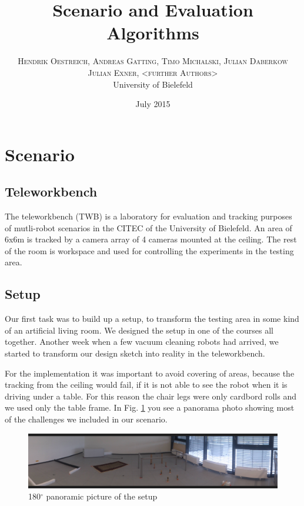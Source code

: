 \documentclass[twoside]{article}
\title{\vspace{-15mm}\fontsize{24pt}{10pt}\selectfont\textbf{Scenario and Evaluation Algorithms}} %
\author{
\large
\textsc{Hendrik Oestreich, Andreas Gatting, Timo Michalski, Julian Daberkow}\\
\textsc{Julian Exner, <further Authors>}\\%
\normalsize University of Bielefeld \\ %
}
\date{July 2015}
\begin{document}
\maketitle %

\thispagestyle{fancy} %




\section{Scenario}
\subsection{Teleworkbench}
The teleworkbench (TWB) is a laboratory for evaluation and tracking purposes of mutli-robot scenarios in the CITEC of the University of Bielefeld. An area of 6x6m is tracked by a camera array of 4 cameras mounted at the ceiling. The rest of the room is workspace and used for controlling the experiments in the testing area. 

\subsection{Setup} %
Our first task was to build up a setup, to transform the testing area in some kind of an artificial living room. We designed the setup in one of the courses all together. Another week when a few vacuum cleaning robots had arrived, we started to transform our design sketch into reality in the teleworkbench.

For the implementation it was important to avoid covering of areas, because the tracking from the ceiling would fail, if it is not able to see the robot when it is driving under a table.
For this reason the chair legs were only cardbord rolls and we used only the table frame. In Fig. \ref{fig:panorama} you see a panorama photo showing most of the challenges we included in our scenario.

\begin{figure}[H]
	\centering
	\includegraphics[width=\textwidth]{pictures/Setup_panorama.JPG}
	\caption{180$^\circ$ panoramic picture of the setup}
	\label{fig:panorama}
\end{figure}
\end{document}
